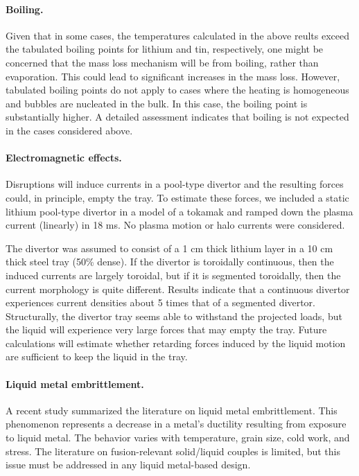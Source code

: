 \paragraph{Boiling. } Given that in some cases, the temperatures calculated
in the above reults exceed the tabulated boiling points for lithium and tin,
respectively, one might be concerned that the mass loss mechanism will be from
boiling, rather than evaporation. This could lead to significant increases in
the mass loss. However, tabulated boiling points do not apply to cases where
the heating is homogeneous and bubbles are nucleated in the bulk. In this
case, the boiling point is substantially higher. A detailed assessment
indicates that boiling is not expected in the cases considered above.

\paragraph{Electromagnetic effects. } Disruptions will induce currents in
a pool-type divertor and the resulting forces could, in principle, empty the
tray. To estimate these forces, we included a static lithium pool-type
divertor in a model of a tokamak and ramped down the plasma current (linearly)
in 18 ms. No plasma motion or halo currents were considered.

The divertor was assumed to consist of a 1 cm thick lithium layer in a 10 cm
thick steel tray (50\% dense). If the divertor is toroidally continuous, then
the induced currents are largely toroidal, but if it is segmented toroidally,
then the current morphology is quite different. Results indicate that a
continuous divertor experiences current densities about 5 times that of a
segmented divertor. Structurally, the divertor tray seems able to withstand
the projected loads, but the liquid will experience very large forces that may
empty the tray. Future calculations will estimate whether retarding forces
induced by the liquid motion are sufficient to keep the liquid in the tray.

\paragraph{Liquid metal embrittlement. } A recent study summarized the
literature on liquid metal embrittlement. This phenomenon represents a
decrease in a metal’s ductility resulting from exposure to liquid metal. The
behavior varies with temperature, grain size, cold work, and stress. The
literature on fusion-relevant solid/liquid couples is limited, but this issue
must be addressed in any liquid metal-based design.

